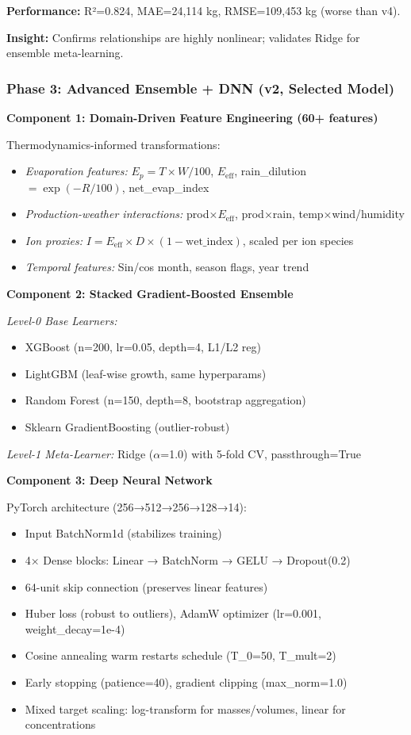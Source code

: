 \documentclass[conference]{IEEEtran}
\begin{document}
\textbf{Performance:} R²=0.824, MAE=24,114 kg, RMSE=109,453 kg (worse than v4).

\textbf{Insight:} Confirms relationships are highly nonlinear; validates Ridge for ensemble meta-learning.

\subsubsection{Phase 3: Advanced Ensemble + DNN (v2, Selected Model)}
\textbf{Component 1: Domain-Driven Feature Engineering (60+ features)}

Thermodynamics-informed transformations:
\begin{itemize}
    \item \textit{Evaporation features:} $E_p = T \times W / 100$, $E_{\text{eff}}$, rain\_dilution $= \exp(-R/100)$, net\_evap\_index
    \item \textit{Production-weather interactions:} prod×$E_{\text{eff}}$, prod×rain, temp×wind/humidity
    \item \textit{Ion proxies:} $I = E_{\text{eff}} \times D \times (1 - \text{wet\_index})$, scaled per ion species
    \item \textit{Temporal features:} Sin/cos month, season flags, year trend
\end{itemize}

\textbf{Component 2: Stacked Gradient-Boosted Ensemble}

\textit{Level-0 Base Learners:}
\begin{itemize}
    \item XGBoost (n=200, lr=0.05, depth=4, L1/L2 reg)
    \item LightGBM (leaf-wise growth, same hyperparams)
    \item Random Forest (n=150, depth=8, bootstrap aggregation)
    \item Sklearn GradientBoosting (outlier-robust)
\end{itemize}

\textit{Level-1 Meta-Learner:} Ridge ($\alpha$=1.0) with 5-fold CV, passthrough=True

\textbf{Component 3: Deep Neural Network}

PyTorch architecture (256→512→256→128→14):
\begin{itemize}
    \item Input BatchNorm1d (stabilizes training)
    \item 4× Dense blocks: Linear → BatchNorm → GELU → Dropout(0.2)
    \item 64-unit skip connection (preserves linear features)
    \item Huber loss (robust to outliers), AdamW optimizer (lr=0.001, weight\_decay=1e-4)
    \item Cosine annealing warm restarts schedule (T\_0=50, T\_mult=2)
    \item Early stopping (patience=40), gradient clipping (max\_norm=1.0)
    \item Mixed target scaling: log-transform for masses/volumes, linear for concentrations
\end{itemize}
\end{document}
